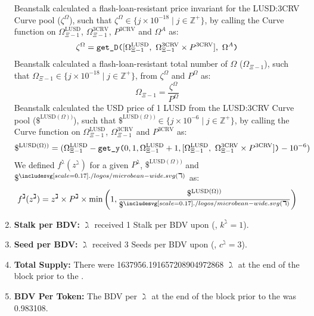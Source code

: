 \documentclass[class=article, crop=false]{standalone}
\begin{document}
\begin{enumerate}
Beanstalk calculated a flash-loan-resistant price invariant for the LUSD:3CRV Curve pool ($\zeta^{\Omega}$), such that $\zeta^{\Omega} \in \{j \times 10^{-18} \mid j \in \mathbb{Z}^{+} \}$, by calling the Curve  function on $\Omega_{\Xi-1}^{\text{LUSD}}$, $\Omega_{\Xi-1}^{\text{3CRV}}$, $P^{\text{3CRV}}$ and $\Omega^{A}$ as:
$$\zeta^{\Omega} = \code{get\_D(}[\Omega_{\Xi-1}^{\text{LUSD}},\ \Omega_{\Xi-1}^{\text{3CRV}} \times P^{\text{3CRV}}],\ \Omega^{A}\code{)}$$
Beanstalk calculated a flash-loan-resistant total number of $\Omega$ ($\Omega_{\Xi-1}$), such that $\Omega_{\Xi-1} \in \{j \times 10^{-18} \mid j \in \mathbb{Z}^{+} \}$, from $\zeta^{\Omega}$ and $P^{\Omega}$ as:
$$\Omega_{\Xi-1} = \frac{\zeta^{\Omega}}{P^{\Omega}}$$
Beanstalk calculated the USD price of 1 LUSD from the LUSD:3CRV Curve pool ($\$^{\text{LUSD}(\Omega))}$), such that $\$^{\text{LUSD}(\Omega))} \in \{j \times 10^{-6} \mid j \in \mathbb{Z}^{+} \}$, by calling the Curve  function on $\Omega_{\Xi-1}^{\text{LUSD}}$, $\Omega_{\Xi-1}^{\text{3CRV}}$ and $P^{\text{3CRV}}$ as:
$$\$^{\text{LUSD}(\Omega))} =  (\Omega_{\Xi-1}^{\text{LUSD}} - \code{get\_y(}0, 1, \Omega_{\Xi-1}^{\text{LUSD}} + 1, [\Omega_{\Xi-1}^{\text{LUSD}},\ \Omega_{\Xi-1}^{\text{3CRV}} \times P^{\text{3CRV}}]\code{)} - 10^{-6})$$
We defined $f^{\gimel}(z^{\gimel})$ for a given $P^{\gimel}$, $\$^{\text{LUSD}(\Omega))}$ and $\$^{\bean(\daleth)}$ as:
$$f^{\gimel}(z^{\gimel}) = z^{\gimel} \times P^{\gimel} \times \text{min}\left(1, \frac{\$^{\text{LUSD}(\Omega))}}{\$^{\bean(\daleth)}}\right)$$
        \item \textbf{Stalk per BDV:} $\gimel$  received 1 Stalk per BDV upon  (, $k^{\gimel} = 1$).
        \item \textbf{Seed per BDV:} $\gimel$  received 3 Seeds per BDV upon  (, $c^{\gimel} = 3$).
        \item \textbf{Total Supply:} There were 1637956.191657208904972868 $\gimel$ at the end of the block prior to the .
        \item \textbf{BDV Per Token:} The BDV per $\gimel$ at the end of the block prior to the  was 0.983108.
    \end{enumerate}
\end{document}
